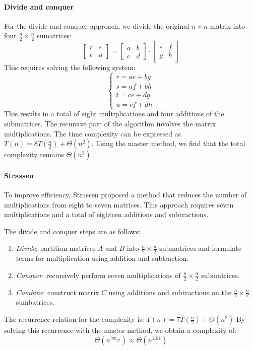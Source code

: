 \paragraph*{Divide and conquer}
For the divide and conquer approach, we divide the original $n\times n$ matrix into four $\frac{n}{2}\times\frac{n}{2}$ sumatrices: 
\[\begin{bmatrix} r & s \\ t & u \end{bmatrix}=\begin{bmatrix} a & b \\ c & d \end{bmatrix} \cdot \begin{bmatrix} e & f \\ g & h \end{bmatrix}\]
This requires solving the following system:
\[\begin{cases} r = ae + bg \\ s = af + bh \\ t = ce + dg \\ u = cf + dh \end{cases}\]
This results in a total of eight multiplications and four additions of the submatrices. 
The recursive part of the algorithm involves the matrix multiplications. 
The time complexity can be expressed as $T(n)=8T\left(\frac{n}{2}\right)+\Theta(n^2)$.
Using the master method, we find that the total complexity remains $\Theta(n^3)$.

\paragraph*{Strassen}
To improve efficiency, Strassen proposed a method that reduces the number of multiplications from eight to seven matrices.
This approach requires seven multiplications and a total of eighteen additions and subtractions.

The divide and conquer steps are as follows:
\begin{enumerate}
    \item \textit{Divide}: partition matrices $A$ and $B$ into $\frac{n}{2}\times\frac{n}{2}$ submatrices and formulate terms for multiplication using addition and subtraction.
    \item \textit{Conquer}: recursively perform seven multiplications of $\frac{n}{2}\times\frac{n}{2}$ submatrices.
    \item \textit{Combine}: construct matrix $C$ using additions and subtractions on the $\frac{n}{2}\times\frac{n}{2}$ sumbatrices. 
\end{enumerate}
The recurrence relation for the complexity is: $T(n)=7T\left(\frac{n}{2}\right)+\Theta(n^2)$
By solving this recurrence with the master method, we obtain a complexity of:
\[\Theta\left(n^{\log_27}\right)\approx \Theta\left(n^{2.81}\right)\]

